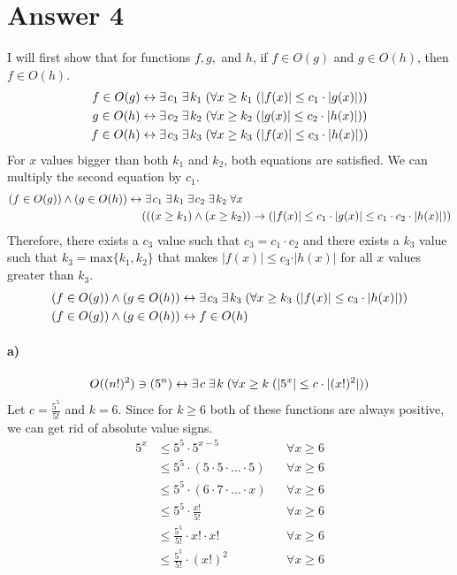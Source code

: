 \documentclass[12pt]{article}
\newcommand\+{\mkern2mu}
\begin{document}
\section*{Answer 4}
I will first show that for functions $f, g,$ and $h$, if $f \in O(g)$ and $g \in O(h)$, then $f \in O(h)$.
\begin{align*}
f \in O(g) &\leftrightarrow \exists \+ c_1 \; \exists \+ k_1 \; (\forall x \geq k_1 \; (\vert f(x) \vert \leq c_1 \cdot \vert g(x) \vert)) \\
g \in O(h) &\leftrightarrow \exists \+ c_2 \; \exists \+ k_2 \; (\forall x \geq k_2 \; (\vert g(x) \vert \leq c_2 \cdot \vert h(x) \vert)) \\
f \in O(h) &\leftrightarrow \exists \+ c_3 \; \exists \+ k_3 \; (\forall x \geq k_3 \; (\vert f(x) \vert \leq c_3 \cdot \vert h(x) \vert))
\end{align*}
For $x$ values bigger than both $k_1$ and $k_2$, both equations are satisfied.
We can multiply the second equation by $c_1$.
\begin{align*}
(f \in O(g)) \land (g \in O(h)) \leftrightarrow& \; \exists \+ c_1 \; \exists \+ k_1 \; \exists \+ c_2 \; \exists \+ k_2 \; \forall x \\
&(((x \geq k_1) \land (x \geq k_2)) \rightarrow (\vert f(x) \vert \leq c_1 \cdot \vert g(x) \vert \leq c_1 \cdot c_2 \cdot \vert h(x) \vert))
\end{align*}
Therefore, there exists a $c_3$ value such that $c_3 = c_1 \cdot c_2$ and there exists a $k_3$ value such that $k_3 = \text{max}\{k_1, k_2\}$ that makes $\vert f(x) \vert \leq c_3 \cdot \vert h(x) \vert$ for all $x$ values greater than $k_3$.
\begin{align*}
(f \in O(g)) \land (g \in O(h)) &\leftrightarrow \exists \+ c_3 \; \exists \+ k_3 \; (\forall x \geq k_3 \; (\vert f(x) \vert \leq c_3 \cdot \vert h(x) \vert)) \\
(f \in O(g)) \land (g \in O(h)) &\leftrightarrow f \in O(h)
\end{align*}
\paragraph{a)} %
\begin{gather*}
O((n!)^2) \ni (5^n) \leftrightarrow \exists \+ c \; \exists \+ k \; (\forall x \geq k \; (\vert 5^x \vert \leq c \cdot \vert (x!)^2 \vert))
\end{gather*}
Let $c = \frac{5^5}{5!}$ and $k = 6$.
Since for $k \geq 6$ both of these functions are always positive, we can get rid of absolute value signs.
\begin{align*}
5^x &\leq 5^5 \cdot 5^{x-5} && \forall x \geq 6 \\
&\leq 5^5 \cdot (5 \cdot 5 \cdot \dotso \cdot 5) && \forall x \geq 6 \\
&\leq 5^5 \cdot (6 \cdot 7 \cdot \dotso \cdot x) && \forall x \geq 6 \\
&\leq 5^5 \cdot \tfrac{x!}{5!} && \forall x \geq 6 \\
&\leq \tfrac{5^5}{5!} \cdot x! \cdot x! && \forall x \geq 6 \\
&\leq \tfrac{5^5}{5!} \cdot (x!)^2 && \forall x \geq 6
\end{align*}
\end{document}
